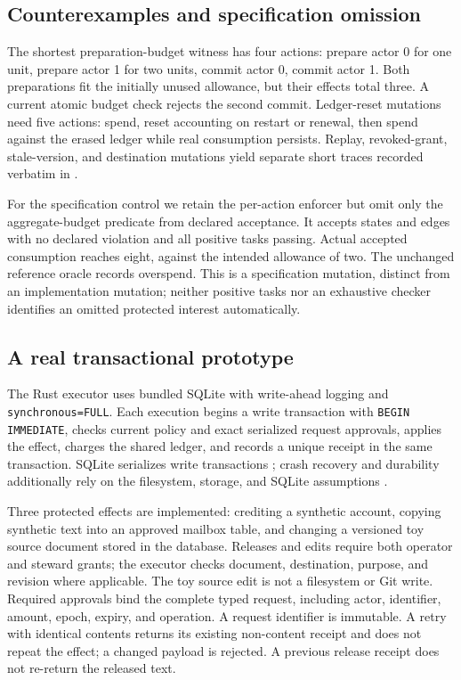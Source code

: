 \subsection{Counterexamples and specification omission}
\label{sec:omission}
The shortest preparation-budget witness has four actions: prepare actor 0 for one unit, prepare actor 1 for two units, commit actor 0, commit actor 1. Both preparations fit the initially unused allowance, but their effects total three. A current atomic budget check rejects the second commit. Ledger-reset mutations need five actions: spend, reset accounting on restart or renewal, then spend against the erased ledger while real consumption persists. Replay, revoked-grant, stale-version, and destination mutations yield separate short traces recorded verbatim in .

For the specification control we retain the per-action enforcer but omit only the aggregate-budget predicate from declared acceptance. It accepts \OmittedStates{} states and \OmittedEdges{} edges with no declared violation and all positive tasks passing. Actual accepted consumption reaches eight, against the intended allowance of two. The unchanged reference oracle records overspend. This is a specification mutation, distinct from an implementation mutation; neither positive tasks nor an exhaustive checker identifies an omitted protected interest automatically.

\subsection{A real transactional prototype}
\label{sec:runtime}
The Rust executor uses bundled SQLite with write-ahead logging and \texttt{synchronous=FULL}. Each execution begins a write transaction with \texttt{BEGIN IMMEDIATE}, checks current policy and exact serialized request approvals, applies the effect, charges the shared ledger, and records a unique receipt in the same transaction. SQLite serializes write transactions \cite{sqlite-transaction}; crash recovery and durability additionally rely on the filesystem, storage, and SQLite assumptions \cite{sqlite-wal}.

Three protected effects are implemented: crediting a synthetic account, copying synthetic text into an approved mailbox table, and changing a versioned toy source document stored in the database. Releases and edits require both operator and steward grants; the executor checks document, destination, purpose, and revision where applicable. The toy source edit is not a filesystem or Git write. Required approvals bind the complete typed request, including actor, identifier, amount, epoch, expiry, and operation. A request identifier is immutable. A retry with identical contents returns its existing non-content receipt and does not repeat the effect; a changed payload is rejected. A previous release receipt does not re-return the released text.

